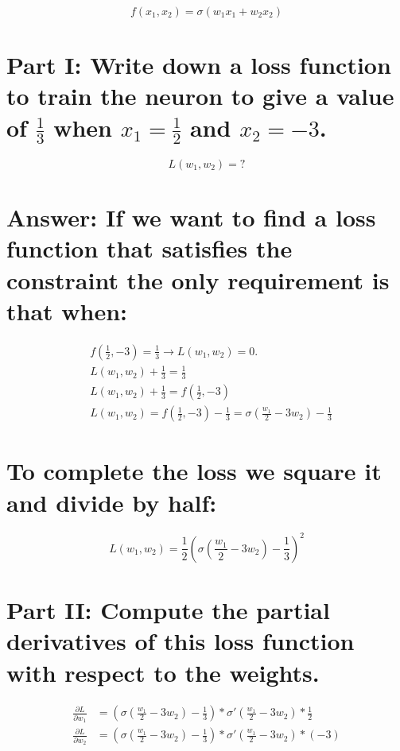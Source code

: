\documentclass{article}
\begin{document}
\begin{equation}
f(x_1,x_2) = \sigma(w_1x_1 + w_2x_2)
\end{equation}

\section*{\normalfont Part I: Write down a loss function to train the neuron to give a value of $\frac{1}{3}$ when $x_1 = \frac{1}{2}$ and $x_2 = -3$.}

\begin{equation}
L(w_1,w_2) = ?
\end{equation}

\section*{Answer: If we want to find a loss function that satisfies the constraint the only requirement is that when:}

\begin{equation}
\begin{split}
& f(\frac{1}{2},-3) = \frac{1}{3} \longrightarrow L(w_1,w_2) = 0. \\
& L(w_1,w_2) + \frac{1}{3} = \frac{1}{3} \\
& L(w_1,w_2) + \frac{1}{3} = f(\frac{1}{2},-3) \\
& L(w_1,w_2) = f(\frac{1}{2},-3) - \frac{1}{3} = \sigma(\frac{w_1}{2} - 3w_2) - \frac{1}{3}
\end{split}
\end{equation}

\section*{To complete the loss we square it and divide by half:}

\begin{equation}
L(w_1,w_2) = \frac{1}{2}(\sigma(\frac{w_1}{2} - 3w_2) - \frac{1}{3})^2
\end{equation}

\section*{\normalfont Part II: Compute the partial derivatives of this loss function with respect to the weights.}

\begin{equation}
\begin{split}
\frac{\partial L}{\partial w_1} & = (\sigma (\frac{w_1}{2} - 3w_2) - \frac{1}{3})*\sigma'(\frac{w_1}{2} - 3w_2)*\frac{1}{2} \\ 
\frac{\partial L}{\partial w_2} & = (\sigma (\frac{w_1}{2} - 3w_2) - \frac{1}{3})*\sigma'(\frac{w_1}{2} - 3w_2)*(-3) \\ 
\end{split}
\end{equation}
\end{document}
